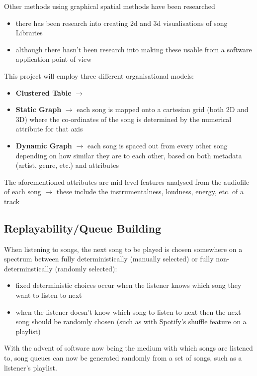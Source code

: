 Other methods using graphical spatial methods have been researched\begin{itemize}
    \item there has been research into creating 2d and 3d visualisations of song Libraries
    \item although there hasn't been research into making these usable from a software application point of view
\end{itemize}

This project will employ three different organisational models:\begin{itemize}
    \item \textbf{Clustered Table} \(\to\) %
    \item \textbf{Static Graph} \(\to\) each song is mapped onto a cartesian grid (both 2D and 3D) where the co-ordinates of the song is determined by the numerical attribute for that axis
    \item \textbf{Dynamic Graph} \(\to\) each song is spaced out from every other song depending on how similar they are to each other, based on both metadata (artist, genre, etc.) and attributes
\end{itemize}

The aforementioned attributes are mid-level features analysed from the audiofile of each song \(\to\) these include the instrumentalness, loudness, energy, etc. of a track

\subsection{Replayability/Queue Building}
When listening to songs, the next song to be played is chosen somewhere on a spectrum between fully deterministically (manually selected) or fully non-determinstically (randomly selected):\begin{itemize}
    \item fixed deterministic choices occur when the listener knows which song they want to listen to next
    \item when the listener doesn't know which song to listen to next then the next song should be randomly chosen (such as with Spotify's shuffle feature on a playlist)
\end{itemize}

With the advent of software now being the medium with which songs are listened to, song queues can now be generated randomly from a set of songs, such as a listener's playlist.

